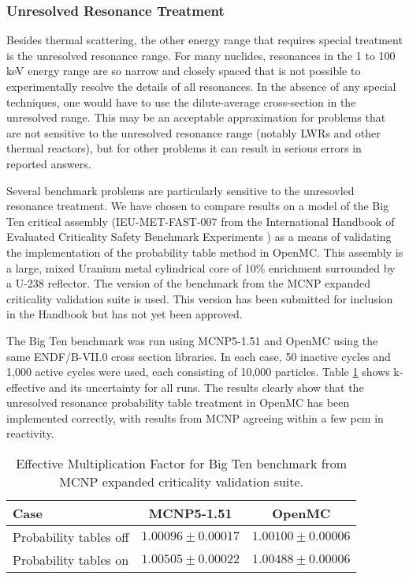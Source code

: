 \documentclass{elsarticle}
\begin{document}
\subsubsection{Unresolved Resonance Treatment}

Besides thermal scattering, the other energy range that requires special
treatment is the unresolved resonance range. For many nuclides, resonances in
the 1 to 100 keV energy range are so narrow and closely spaced that is not
possible to experimentally resolve the details of all resonances. In the absence
of any special techniques, one would have to use the dilute-average
cross-section in the unresolved range. This may be an acceptable approximation
for problems that are not sensitive to the unresolved resonance range (notably
LWRs and other thermal reactors), but for other problems it can result in
serious errors in reported answers.

Several benchmark problems are particularly sensitive to the unresovled
resonance treatment. We have chosen to compare results on a model of the Big Ten
critical assembly (IEU-MET-FAST-007 from the International Handbook of Evaluated
Criticality Safety Benchmark Experiments \cite{icsbep}) as a means of validating
the implementation of the probability table method in OpenMC. This assembly is a
large, mixed Uranium metal cylindrical core of 10\% enrichment surrounded by a
U-238 reflector. The version of the benchmark from the MCNP expanded criticality
validation suite \cite{mcnp-validation} is used. This version has been submitted
for inclusion in the Handbook but has not yet been approved.

The Big Ten benchmark was run using MCNP5-1.51 and OpenMC using the same
ENDF/B-VII.0 cross section libraries. In each case, 50 inactive cycles and 1,000
active cycles were used, each consisting of 10,000 particles. Table
\ref{tab:bigten} shows k-effective and its uncertainty for all runs. The results
clearly show that the unresolved resonance probability table treatment in OpenMC
has been implemented correctly, with results from MCNP agreeing within a few pcm
in reactivity.

\begin{table}
  \caption{Effective Multiplication Factor for Big Ten benchmark from MCNP
    expanded criticality validation suite.}
  \label{tab:bigten}
  \begin{center}
  \begin{tabular}{ l c c }
    \hline
    Case & MCNP5-1.51 & OpenMC \\
    \hline
    Probability tables off & $1.00096 \pm 0.00017$ & $1.00100 \pm 0.00006$ \\
    Probability tables on  & $1.00505 \pm 0.00022$ & $1.00488 \pm 0.00006$ \\
    \hline
  \end{tabular}
  \end{center}
\end{table}
\end{document}
